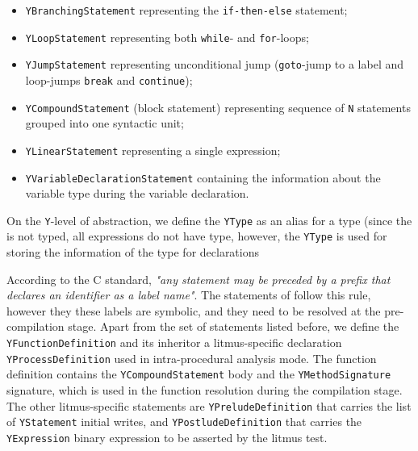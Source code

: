 \begin{itemize}%
  \item \texttt{YBranchingStatement} representing the \texttt{if-then-else} statement;
  
  \item \texttt{YLoopStatement} representing both \texttt{while}- and \texttt{for}-loops;%
  
  \item \texttt{YJumpStatement} representing unconditional jump (\texttt{goto}-jump to a label and loop-jumps \texttt{break} and \texttt{continue});
  
  \item \texttt{YCompoundStatement} (block statement) representing sequence of \texttt{N} statements grouped into one syntactic unit;
  
  \item \texttt{YLinearStatement} representing a single expression;
  
  \item \texttt{YVariableDeclarationStatement} containing the information about the variable type during the variable declaration.
\end{itemize}

On the \texttt{Y}-level of abstraction, we define the \texttt{YType} as an alias for a type (since the \ytree{} is not typed, all expressions do not have type, however, the \texttt{YType} is used for storing the information of the type for declarations

According to the C standard, \textit{"any statement may be preceded by a prefix that declares an identifier as a label name"}.
The \ytree{} statements of follow this rule, however they these labels are symbolic, and they need to be resolved at the pre-compilation stage.
Apart from the set of statements listed before, we define the \texttt{YFunctionDefinition} and its inheritor a litmus-specific declaration \texttt{YProcessDefinition}
used in intra-procedural analysis mode.
The function definition contains the \texttt{YCompoundStatement} body and the \texttt{YMethodSignature} signature, which is used in the function resolution during the compilation stage. %
The other litmus-specific statements are \texttt{YPreludeDefinition}
that carries the list of \texttt{YStatement} initial writes, and \texttt{YPostludeDefinition} 
that carries the \texttt{YExpression} binary expression to be asserted by the litmus test.

